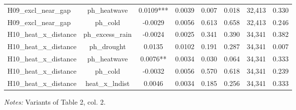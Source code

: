 \begin{table}[htbp]
\begin{tabular}{lccccccc}
H09\_excl\_near\_gap & ph\_heatwave & 0.0109*** & 0.0039 & 0.007 & 0.018 & 32,413 & 0.330 \\
H09\_excl\_near\_gap & ph\_cold & -0.0029 & 0.0056 & 0.613 & 0.658 & 32,413 & 0.246 \\
H10\_heat\_x\_distance & ph\_excess\_rain & -0.0024 & 0.0025 & 0.341 & 0.390 & 34,341 & 0.382 \\
H10\_heat\_x\_distance & ph\_drought & 0.0135 & 0.0102 & 0.191 & 0.287 & 34,341 & 0.007 \\
H10\_heat\_x\_distance & ph\_heatwave & 0.0076** & 0.0034 & 0.030 & 0.064 & 34,341 & 0.333 \\
H10\_heat\_x\_distance & ph\_cold & -0.0032 & 0.0056 & 0.570 & 0.618 & 34,341 & 0.239 \\
H10\_heat\_x\_distance & heat\_x\_lndist & 0.0046 & 0.0034 & 0.185 & 0.256 & 34,341 & 0.333 \\
\bottomrule
\end{tabular}
\begin{minipage}{0.95\linewidth}\footnotesize \textit{Notes:} Variants of Table 2, col. 2.\end{minipage}
\end{table}